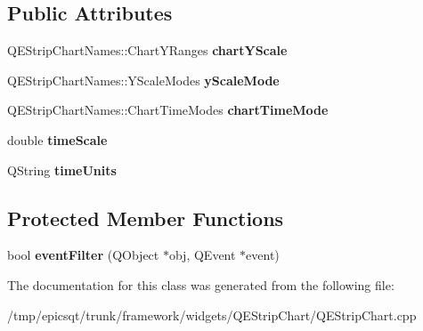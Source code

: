 \subsection*{Public Attributes}
\begin{DoxyCompactItemize}
\item 
\hypertarget{classQEStripChart_1_1PrivateData_a630662447ce598f76137f27300dbc7ff}{
QEStripChartNames::ChartYRanges {\bfseries chartYScale}}
\label{classQEStripChart_1_1PrivateData_a630662447ce598f76137f27300dbc7ff}

\item 
\hypertarget{classQEStripChart_1_1PrivateData_a570ad5729aeaabf777bee4086f520b29}{
QEStripChartNames::YScaleModes {\bfseries yScaleMode}}
\label{classQEStripChart_1_1PrivateData_a570ad5729aeaabf777bee4086f520b29}

\item 
\hypertarget{classQEStripChart_1_1PrivateData_ac886dded63e0c49da1dc4bf8b2c853ed}{
QEStripChartNames::ChartTimeModes {\bfseries chartTimeMode}}
\label{classQEStripChart_1_1PrivateData_ac886dded63e0c49da1dc4bf8b2c853ed}

\item 
\hypertarget{classQEStripChart_1_1PrivateData_af67296aa908ba9772643a137bd6f0505}{
double {\bfseries timeScale}}
\label{classQEStripChart_1_1PrivateData_af67296aa908ba9772643a137bd6f0505}

\item 
\hypertarget{classQEStripChart_1_1PrivateData_a0aaa2b45076688cbd62363a84987d8ac}{
QString {\bfseries timeUnits}}
\label{classQEStripChart_1_1PrivateData_a0aaa2b45076688cbd62363a84987d8ac}

\end{DoxyCompactItemize}
\subsection*{Protected Member Functions}
\begin{DoxyCompactItemize}
\item 
\hypertarget{classQEStripChart_1_1PrivateData_ad63571dec7b41b4d6236b694054ddb7a}{
bool {\bfseries eventFilter} (QObject $\ast$obj, QEvent $\ast$event)}
\label{classQEStripChart_1_1PrivateData_ad63571dec7b41b4d6236b694054ddb7a}

\end{DoxyCompactItemize}


The documentation for this class was generated from the following file:\begin{DoxyCompactItemize}
\item 
/tmp/epicsqt/trunk/framework/widgets/QEStripChart/QEStripChart.cpp\end{DoxyCompactItemize}
